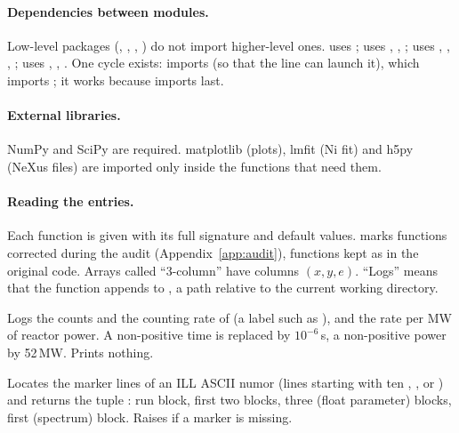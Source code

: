 \documentclass[11pt,a4paper]{article}
\begin{document}
\paragraph{Dependencies between modules.} Low-level packages
(, , , ) do not import
higher-level ones.  uses ;  uses
, , ;  uses
, , , ; 
uses , , . One cycle exists:
 imports  (so that the
 line can launch it), which imports ; it works
because  imports  last.

\paragraph{External libraries.} NumPy and SciPy are required.
matplotlib (plots), lmfit (Ni fit) and h5py (NeXus files) are imported only
inside the functions that need them.

\paragraph{Reading the entries.} Each function is given with its full
signature and default values.  marks functions corrected during
the audit (Appendix~\ref{app:audit}), \legacy{} functions kept as in the
original code. Arrays called ``3-column'' have columns $(x, y, e)$.
``Logs'' means that the function appends to ,
a path relative to the current working directory.



Logs the counts and the counting rate of  (a label such as
), and the rate per MW of reactor power. A non-positive
time is replaced by $10^{-6}$\,s, a non-positive power by 52\,MW. Prints
nothing. \legacy

Locates the marker lines of an ILL ASCII numor (lines starting with ten
, ,  or ) and returns the tuple
: run block,
first two  blocks, three  (float parameter) blocks, first
 (spectrum) block. Raises  if a marker is missing.
\end{document}
